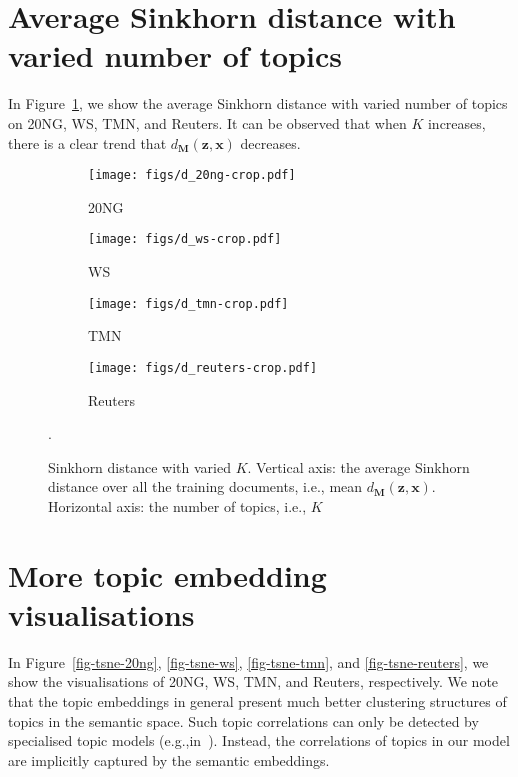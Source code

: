 \documentclass{article}
\renewcommand{\vec}{\boldsymbol}
\newcommand{\matr}[1]{\mathbf{#1}}
\begin{document}
\section{Average Sinkhorn distance with varied number of topics}
In Figure~\ref{fig-d}, we show the average Sinkhorn distance with varied number of topics on 20NG, WS, TMN, and Reuters. It can be observed that when $K$ increases, there is a clear trend that $d_\matr{M}(\vec{z},\vec{x})$ decreases.

\begin{figure}[t]
        \centering
         \begin{subfigure}[b]{0.23\linewidth}
                 \centering
                 \caption{20NG}
                 \texttt{[image: figs/d\_20ng-crop.pdf]}
         \end{subfigure}
          \hspace{0.0005\textwidth}
         \begin{subfigure}[b]{0.23\linewidth}
                 \centering
                 \caption{WS}
                 \texttt{[image: figs/d\_ws-crop.pdf]}
         \end{subfigure} 
         \hspace{0.0005\textwidth}
         \begin{subfigure}[b]{0.23\linewidth}
                 \centering
                 \caption{TMN}
                 \texttt{[image: figs/d\_tmn-crop.pdf]}
         \end{subfigure}\hspace{0.0005\textwidth}
         \begin{subfigure}[b]{0.23\linewidth}
                 \centering
                \caption{Reuters}
                 \texttt{[image: figs/d\_reuters-crop.pdf]}
         \end{subfigure}
\caption{Sinkhorn distance with varied $K$. Vertical axis: the average Sinkhorn distance over all the training documents, i.e., mean $d_{\matr{M}}(\vec{z}, \vec{x})$. Horizontal axis: the number of topics, i.e., $K$}.
\label{fig-d}
\end{figure}


\newpage
\section{More topic embedding visualisations}
\label{a-sec-more-vis}
In Figure~\ref{fig-tsne-20ng}, \ref{fig-tsne-ws}, \ref{fig-tsne-tmn}, and \ref{fig-tsne-reuters}, we show the visualisations of 20NG, WS, TMN, and Reuters, respectively. We note that the topic embeddings in general present much better clustering structures of topics in the semantic space. Such topic correlations can only be detected by specialised topic models (e.g.,in~\cite{lafferty2006correlated,blei2010nested,zhou2016augmentable}).
Instead, the correlations of topics in our model are implicitly captured by the semantic embeddings.
\end{document}
